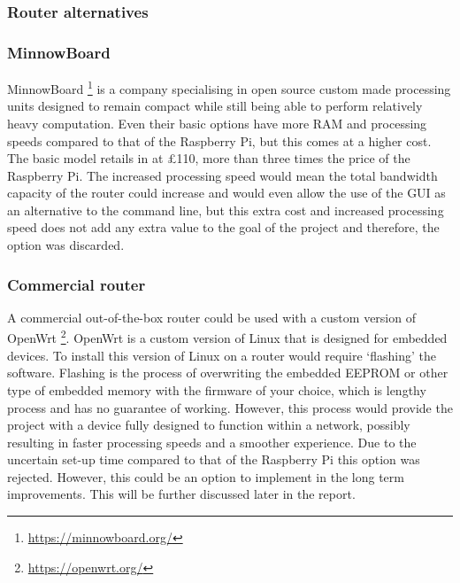 \subsubsection{Router alternatives}

\subsubsection*{MinnowBoard}
MinnowBoard \footnote{\url{https://minnowboard.org/}} is a company specialising in open source custom made processing units designed to remain compact while still being able to perform relatively heavy computation. Even their basic options have more RAM and processing speeds compared to that of the Raspberry Pi, but this comes at a higher cost. The basic model retails in at £110, more than three times the price of the Raspberry Pi. The increased processing speed would mean the total bandwidth capacity of the router could increase and would even allow the use of the GUI as an alternative to the command line, but this extra cost and increased processing speed does not add any extra value to the goal of the project and therefore, the option was discarded.

\subsubsection*{Commercial router}
A commercial out-of-the-box router could be used with a custom version of OpenWrt \footnote{\url{https://openwrt.org/}}. OpenWrt is a custom version of Linux that is designed for embedded devices. To install this version of Linux on a router would require `flashing' the software. Flashing is the process of overwriting the embedded EEPROM or other type of embedded memory with the firmware of your choice, which is lengthy process and has no guarantee of working. However, this process would provide the project with a device fully designed to function within a network, possibly resulting in faster processing speeds and a smoother experience. Due to the uncertain set-up time compared to that of the Raspberry Pi this option was rejected. However, this could be an option to implement in the long term improvements. This will be further discussed later in the report.


\clearpage
